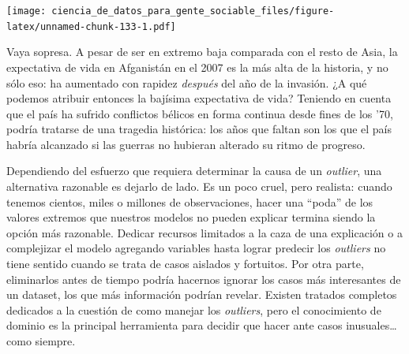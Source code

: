 \documentclass[]{book}
\newenvironment{Shaded}{\begin{snugshade}}{\end{snugshade}}
\newcommand{\KeywordTok}[1]{\textcolor[rgb]{0.13,0.29,0.53}{\textbf{#1}}}
\newcommand{\DataTypeTok}[1]{\textcolor[rgb]{0.13,0.29,0.53}{#1}}
\newcommand{\StringTok}[1]{\textcolor[rgb]{0.31,0.60,0.02}{#1}}
\newcommand{\OperatorTok}[1]{\textcolor[rgb]{0.81,0.36,0.00}{\textbf{#1}}}
\newcommand{\NormalTok}[1]{#1}
\begin{document}
\begin{Shaded}
\end{Shaded}

\texttt{[image: ciencia\_de\_datos\_para\_gente\_sociable\_files/figure-latex/unnamed-chunk-133-1.pdf]}

Vaya sopresa. A pesar de ser en extremo baja comparada con el resto de
Asia, la expectativa de vida en Afganistán en el 2007 es la más alta de
la historia, y no sólo eso: ha aumentado con rapidez \emph{después} del
año de la invasión. ¿A qué podemos atribuir entonces la bajísima
expectativa de vida? Teniendo en cuenta que el país ha sufrido
conflictos bélicos en forma continua desde fines de los '70, podría
tratarse de una tragedia histórica: los años que faltan son los que el
país habría alcanzado si las guerras no hubieran alterado su ritmo de
progreso.

Dependiendo del esfuerzo que requiera determinar la causa de un
\emph{outlier}, una alternativa razonable es dejarlo de lado. Es un poco
cruel, pero realista: cuando tenemos cientos, miles o millones de
observaciones, hacer una ``poda'' de los valores extremos que nuestros
modelos no pueden explicar termina siendo la opción más razonable.
Dedicar recursos limitados a la caza de una explicación o a complejizar
el modelo agregando variables hasta lograr predecir los \emph{outliers}
no tiene sentido cuando se trata de casos aislados y fortuitos. Por otra
parte, eliminarlos antes de tiempo podría hacernos ignorar los casos más
interesantes de un dataset, los que más información podrían revelar.
Existen tratados completos dedicados a la cuestión de como manejar los
\emph{outliers}, pero el conocimiento de dominio es la principal
herramienta para decidir que hacer ante casos inusuales\ldots{} como
siempre.
\end{document}
